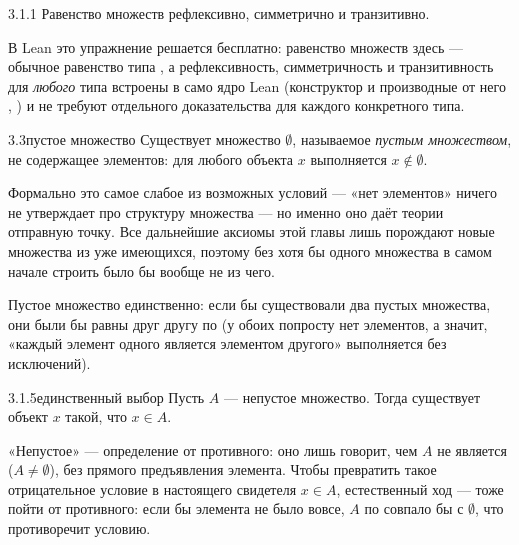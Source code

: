 \begin{exercise}{3.1.1}{}
Равенство множеств рефлексивно, симметрично и транзитивно.
\end{exercise}

\begin{remark}
В Lean это упражнение решается бесплатно: равенство множеств здесь — обычное равенство
\code{=} типа , а рефлексивность, симметричность и транзитивность \code{=} для
\emph{любого} типа встроены в само ядро Lean (конструктор  и производные от
него , ) и не требуют отдельного доказательства для каждого
конкретного типа.
\end{remark}

\begin{axiom}{3.3}{пустое множество}
Существует множество $\emptyset$, называемое \emph{пустым множеством}, не содержащее
элементов: для любого объекта $x$ выполняется $x \notin \emptyset$.
\end{axiom}

\begin{intuition}
Формально это самое слабое из возможных условий — «нет элементов» ничего не утверждает про
структуру множества — но именно оно даёт теории отправную точку. Все дальнейшие аксиомы этой
главы лишь порождают новые множества из уже имеющихся, поэтому без хотя бы одного множества
в самом начале строить было бы вообще не из чего.
\end{intuition}

\begin{remark}
Пустое множество единственно: если бы существовали два пустых множества, они были бы равны
друг другу по  (у обоих попросту нет элементов, а значит,
«каждый элемент одного является элементом другого» выполняется без исключений).
\end{remark}

\begin{lemma}{3.1.5}{единственный выбор}
Пусть $A$ — непустое множество. Тогда существует объект $x$ такой, что $x \in A$.
\end{lemma}

\begin{intuition}
«Непустое» — определение от противного: оно лишь говорит, чем $A$ не является ($A\neq
\emptyset$), без прямого предъявления элемента. Чтобы превратить такое отрицательное условие
в настоящего свидетеля $x\in A$, естественный ход — тоже пойти от противного: если бы элемента
не было вовсе, $A$ по  совпало бы с $\emptyset$, что противоречит
условию.
\end{intuition}

